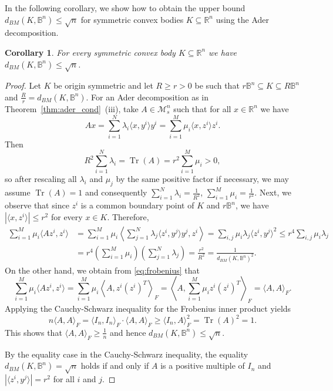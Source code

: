 \documentclass[12pt,a4paper]{article}
\newtheorem{cor}[twr]{Corollary}
\theoremstyle{definition}
\DeclareMathOperator{\tr}{Tr}
\newcommand\R{\mathbb{R}}
\newcommand\B{\mathbb{B}}
\newcommand\ms[1]{\mathcal{M}_s^{#1}}
\begin{document}
In the following corollary, we show how to obtain the upper bound $d_{BM}(K, \B^n) \leq \sqrt{n}$ for symmetric convex bodies $K \subseteq \R^n$ using the Ader decomposition.



\begin{cor}
\label{cor:estimate}
For every symmetric convex body $K \subseteq \R^n$ we have $d_{BM}(K, \B^n) \leq \sqrt{n}$.
\end{cor}
\begin{proof}
Let $K$ be origin symmetric and let $R \geq r > 0$ be such that $r \B^n \subseteq K \subseteq R \B^n$ and $\frac{R}{r} = d_{BM}(K,\B^n)$. For an Ader decomposition as in Theorem~\ref{thm:ader_cond}~(iii), take $A \in \ms{n}$ such that for all $x \in \R^n$ we have
$$ A x = \sum_{i=1}^N \lambda_i \langle x, y^i \rangle y^i = \sum_{i=1}^M \mu_i \langle x, z^i \rangle z^i. $$
Then
$$ R^2 \sum_{i=1}^N \lambda_i = \tr(A) = r^2 \sum_{i=1}^M \mu_i > 0, $$
so after rescaling all $\lambda_i$ and $\mu_j$ by the same positive factor if necessary, we may assume $\tr(A) = 1$ and consequently $\sum_{i=1}^N \lambda_i = \frac{1}{R^2}$, $\sum_{i=1}^M \mu_i = \frac{1}{r^2}$. Next, we observe that since $z^i$ is a common boundary point of $K$ and $r \B^n$, we have $| \langle x, z^i \rangle | \leq r^2$ for every $x \in K$. Therefore,
\begin{align*}
\sum_{i=1}^M \mu_i \langle A z^i, z^i \rangle
& = \sum_{i=1}^M \mu_i \left \langle \sum_{j=1}^{N} \lambda_j \langle z^i, y^j \rangle y^j, z^i \right \rangle
= \sum_{i, j} \mu_i \lambda_j \langle z^i, y^j \rangle^2
\leq r^4 \sum_{i, j} \mu_i \lambda_j
\\
& = r^4 \left ( \sum_{i=1}^{M} \mu_i \right ) \left ( \sum_{j=1}^{N} \lambda_j \right ) = \frac{r^2}{R^2}
= \frac{1}{d_{BM}(K, \B^n)^2}.
\end{align*}
On the other hand, we obtain from \eqref{eq:frobenius} that
$$ \sum_{i=1}^M \mu_i \langle A z^i, z^i \rangle = \sum_{i=1}^M \mu_i \left\langle A, z^i (z^i)^T \right\rangle_F = \left\langle A, \sum_{i=1}^M \mu_i z^i (z^i)^T \right\rangle_F = \langle A, A \rangle_F. $$
Applying the Cauchy-Schwarz inequality for the Frobenius inner product yields
$$ n \langle A, A \rangle_F = \langle I_n, I_n \rangle_F \cdot \langle A, A \rangle_F \geq \langle I_n, A \rangle_F^2 = \tr(A)^2 = 1. $$
This shows that $\langle A, A \rangle_F \geq \frac{1}{n}$ and hence $d_{BM}(K, \B^n) \leq \sqrt{n}$.

By the equality case in the Cauchy-Schwarz inequality, the equality $d_{BM}(K,\B^n) = \sqrt{n}$ holds if and only if $A$ is a positive multiple of $I_n$ and $|\langle z^i, y^j \rangle| = r^2$ for all $i$ and $j$.
\end{proof}
\end{document}
